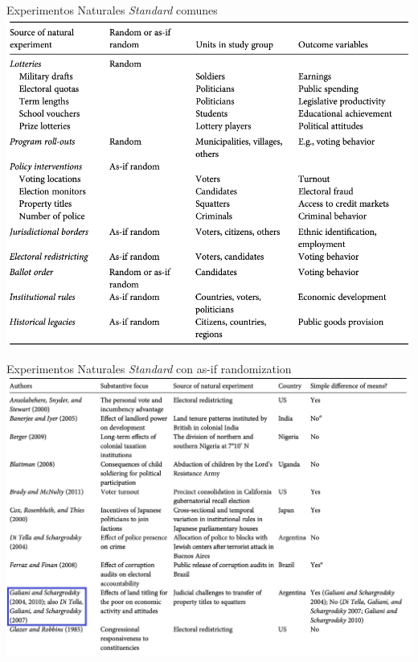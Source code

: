 \documentclass[
  ignorenonframetext,
]{beamer}
\begin{document}
\begin{frame}{Experimentos Naturales \textit{Standard} comunes}
\protect\hypertarget{experimentos-naturales-comunes}{}
\includegraphics{figs/nat_exp_standard1.png}
\end{frame}

\begin{frame}{Experimentos Naturales \textit{Standard} con as-if
randomization}
\protect\hypertarget{experimentos-naturales-con-as-if-randomization}{}
\includegraphics{figs/nat_exp_standard2.png}
\end{frame}
\end{document}
